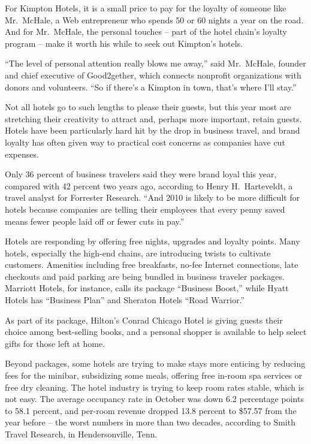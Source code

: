 ﻿\documentclass[12pt]{article}
\begin{document}
For Kimpton Hotels, it is a small price to pay for the loyalty of someone like Mr.~McHale, a Web
entrepreneur who spends 50 or 60 nights a year on the road. And for Mr.~McHale, the personal touches
-- part of the hotel chain's loyalty program -- make it worth his while to seek out Kimpton's
hotels.

``The level of personal attention really blows me away,'' said Mr.~McHale, founder and chief
executive of Good2gether, which connects nonprofit organizations with donors and volunteers. ``So if
there's a Kimpton in town, that's where I'll stay.''

Not all hotels go to such lengths to please their guests, but this year most are stretching their
creativity to attract and, perhaps more important, retain guests. Hotels have been particularly hard
hit by the drop in business travel, and brand loyalty has often given way to practical cost concerns
as companies have cut expenses.

Only 36 percent of business travelers said they were brand loyal this year, compared with 42 percent
two years ago, according to Henry H.~Harteveldt, a travel analyst for Forrester Research. ``And 2010
is likely to be more difficult for hotels because companies are telling their employees that every
penny saved means fewer people laid off or fewer cuts in pay.''

Hotels are responding by offering free nights, upgrades and loyalty points. Many hotels, especially
the high-end chains, are introducing twists to cultivate customers. Amenities including free
breakfasts, no-fee Internet connections, late checkouts and paid parking are being
bundled\cite{bundle} in business traveler packages. Marriott Hotels, for instance, calls its package
``Business Boost,'' while Hyatt Hotels has ``Business Plan'' and Sheraton Hotels ``Road Warrior.''

As part of its package, Hilton's Conrad Chicago Hotel is giving guests their choice among
best-selling books, and a personal shopper is available to help select gifts for those left at home.

Beyond packages, some hotels are trying to make stays more enticing by reducing fees for the
minibar, subsidizing some meals, offering free in-room spa services or free dry cleaning. The hotel
industry is trying to keep room rates stable, which is not easy. The average occupancy rate in
October was down 6.2 percentage points to 58.1 percent, and per-room revenue dropped 13.8 percent to
\$57.57 from the year before -- the worst numbers in more than two decades, according to Smith
Travel Research, in Hendersonville, Tenn.
\end{document}
